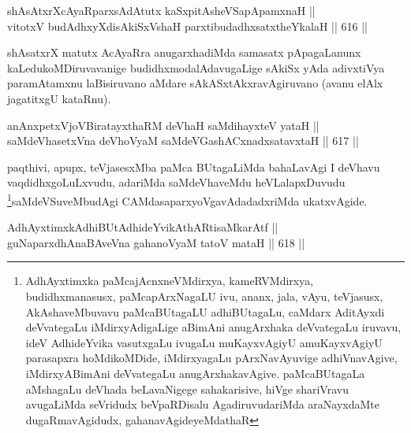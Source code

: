
\begin{shl}
shAsAtxrXcAyaRparxsAdAtutx kaSxpitAsheVSapApamxnaH || \\
vitotxV budAdhxyXdisAkiSxVshaH parxtibudadhxsatxtheYkalaH \hfill || 616 ||  
\end{shl}

\begin{artha}
shAsatxrX matutx AcAyaRra anugarxhadiMda samasatx pApagaLanunx kaLedukoMDiruvavanige budidhxmodalAdavugaLige sAkiSx yAda adivxtiVya paramAtamxnu laBisiruvano aMdare sAkASxtAkxravAgiruvano (avanu elAlx jagatitxgU kataRnu).
\end{artha} 


\begin{shl}
anAnxpetxVjoVBiratayxthaRM deVhaH \footnotemark[1]saMdihayxteV yataH || \\
saMdeVhasetxVna deVhoV\s yaM saMdeVGashACxnadxsatavxtaH \hfill || 617 ||  
\end{shl}

\begin{artha}
paqthivi, apupx, teVjasesxMba paMca BUtagaLiMda bahaLavAgi
I deVhavu vaqdidhxgoLuLxvudu, adariMda saMdeVhaveMdu
heVLalapxDuvudu \footnote{AdhAyxtimxka paMcajAcnxneVMdirxya,
kameRVMdirxya, budidhxmanasusx, paMcapArxNagaLU ivu, ananx, jala,
vAyu, teVjasusx, AkAshaveMbuvavu paMcaBUtagaLU adhiBUtagaLu, caMdarx
AditAyxdi deVvategaLu iMdirxyAdigaLige aBimAni anugArxhaka
deVvategaLu iruvavu, ideV AdhideYvika vasutxgaLu ivugaLu
muKayxvAgiyU amuKayxvAgiyU parasapxra hoMdikoMDide, iMdirxyagaLu
pArxNavAyuvige adhiVnavAgive, iMdirxyABimAni deVvategaLu
anugArxhakavAgive. paMcaBUtagaLa aMshagaLu deVhada beLavaNigege
sahakarisive, hiVge shariVravu avugaLiMda seVridudx beVpaRDisalu
AgadiruvudariMda araNayxdaMte dugaRmavAgidudx, gahanavAgideyeMdathaR}saMdeVSuveMbudAgi CAMdasaparxyoVgavAdadadxriMda ukatxvAgide.
\end{artha}


\begin{shl}
AdhAyxtimxkAdhiBUtAdhideYvikAthARtisaMkarAtf || \\
guNaparxdhAnaBAveVna gahanoV\s yaM tatoV mataH \hfill || 618 ||  
\end{shl}

